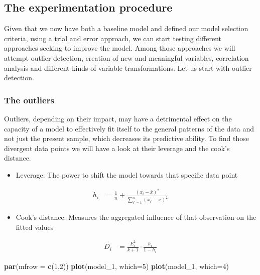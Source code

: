 \documentclass[table]{article}
\newenvironment{Shaded}{\begin{snugshade}}{\end{snugshade}}
\newcommand{\KeywordTok}[1]{\textcolor[rgb]{0.13,0.29,0.53}{\textbf{#1}}}
\newcommand{\DataTypeTok}[1]{\textcolor[rgb]{0.13,0.29,0.53}{#1}}
\newcommand{\DecValTok}[1]{\textcolor[rgb]{0.00,0.00,0.81}{#1}}
\newcommand{\NormalTok}[1]{#1}
\providecommand{\tightlist}{%
  \setlength{\itemsep}{0pt}\setlength{\parskip}{0pt}}
\begin{document}
\subsection{The experimentation
procedure}\label{the-experimentation-procedure}

Given that we now have both a baseline model and defined our model
selection criteria, using a trial and error approach, we can start
testing different approaches seeking to improve the model. Among those
approaches we will attempt outlier detection, creation of new and
meaningful variables, correlation analysis and different kinds of
variable transformations. Let us start with outlier detection.

\subsubsection{The outliers}\label{the-outliers}

Outliers, depending on their impact, may have a detrimental effect on
the capacity of a model to effectively fit itself to the general
patterns of the data and not just the present sample, which decreases
its predictive ability. To find those divergent data points we will have
a look at their leverage and the cook's distance.

\begin{itemize}
\tightlist
\item
  Leverage: The power to shift the model towards that specific data
  point
\end{itemize}

\begin{align*}
    h_i &= \frac{1}{n} + \frac{\left( x_i- \bar{x}\right)^{2}}{\sum_{i'=1}^{n} \left(x_{i'} - \bar{x} \right)^{2}}
\end{align*}

\begin{itemize}
\tightlist
\item
  Cook's distance: Measures the aggregated influence of that observation
  on the fitted values
\end{itemize}

\begin{align*}
    D_i &= \frac{E_{i}^{2}}{k+1} \cdot \frac{h_i}{1-h_i}
\end{align*}

\begin{Shaded}
\begin{Highlighting}[]
\KeywordTok{par}\NormalTok{(}\DataTypeTok{mfrow =} \KeywordTok{c}\NormalTok{(}\DecValTok{1}\NormalTok{,}\DecValTok{2}\NormalTok{))}
\KeywordTok{plot}\NormalTok{(model_}\DecValTok{1}\NormalTok{, }\DataTypeTok{which=}\DecValTok{5}\NormalTok{)}
\KeywordTok{plot}\NormalTok{(model_}\DecValTok{1}\NormalTok{, }\DataTypeTok{which=}\DecValTok{4}\NormalTok{)}
\end{Highlighting}
\end{Shaded}
\end{document}
